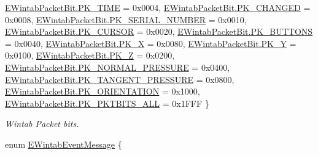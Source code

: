 \begin{DoxyCompactItemize}
\mbox{\hyperlink{namespace_wintab_d_n_a0244b62cdae8bfd39a52f0656ae7d184abf68b8b97a2e596004ec367b4ce63d26}{E\+Wintab\+Packet\+Bit.\+P\+K\+\_\+\+T\+I\+ME}} = 0x0004, 
\mbox{\hyperlink{namespace_wintab_d_n_a0244b62cdae8bfd39a52f0656ae7d184a5fa232826b657d9dfc747022b1ca86d3}{E\+Wintab\+Packet\+Bit.\+P\+K\+\_\+\+C\+H\+A\+N\+G\+ED}} = 0x0008, 
\newline
\mbox{\hyperlink{namespace_wintab_d_n_a0244b62cdae8bfd39a52f0656ae7d184ae27e538a81e4bf7f9769569b5cdd41db}{E\+Wintab\+Packet\+Bit.\+P\+K\+\_\+\+S\+E\+R\+I\+A\+L\+\_\+\+N\+U\+M\+B\+ER}} = 0x0010, 
\mbox{\hyperlink{namespace_wintab_d_n_a0244b62cdae8bfd39a52f0656ae7d184a03e28509372ceace08e89b3cbff310af}{E\+Wintab\+Packet\+Bit.\+P\+K\+\_\+\+C\+U\+R\+S\+OR}} = 0x0020, 
\mbox{\hyperlink{namespace_wintab_d_n_a0244b62cdae8bfd39a52f0656ae7d184a07c256014a5d3ca6ff2f34faa45577f4}{E\+Wintab\+Packet\+Bit.\+P\+K\+\_\+\+B\+U\+T\+T\+O\+NS}} = 0x0040, 
\mbox{\hyperlink{namespace_wintab_d_n_a0244b62cdae8bfd39a52f0656ae7d184ae7367a72ea936eb5525ff4e6b83ba02c}{E\+Wintab\+Packet\+Bit.\+P\+K\+\_\+X}} = 0x0080, 
\newline
\mbox{\hyperlink{namespace_wintab_d_n_a0244b62cdae8bfd39a52f0656ae7d184a252362a32d7e17018570eda4d184e8fd}{E\+Wintab\+Packet\+Bit.\+P\+K\+\_\+Y}} = 0x0100, 
\mbox{\hyperlink{namespace_wintab_d_n_a0244b62cdae8bfd39a52f0656ae7d184a78b0b04b0e8a16d78fd756ab58c2c0a2}{E\+Wintab\+Packet\+Bit.\+P\+K\+\_\+Z}} = 0x0200, 
\mbox{\hyperlink{namespace_wintab_d_n_a0244b62cdae8bfd39a52f0656ae7d184a92f289a82836fc13f7a0a245a88e4cad}{E\+Wintab\+Packet\+Bit.\+P\+K\+\_\+\+N\+O\+R\+M\+A\+L\+\_\+\+P\+R\+E\+S\+S\+U\+RE}} = 0x0400, 
\mbox{\hyperlink{namespace_wintab_d_n_a0244b62cdae8bfd39a52f0656ae7d184adac46407b8f4b2a4b488a0a05b24efdf}{E\+Wintab\+Packet\+Bit.\+P\+K\+\_\+\+T\+A\+N\+G\+E\+N\+T\+\_\+\+P\+R\+E\+S\+S\+U\+RE}} = 0x0800, 
\newline
\mbox{\hyperlink{namespace_wintab_d_n_a0244b62cdae8bfd39a52f0656ae7d184a0efa990069921977338d297e402e961b}{E\+Wintab\+Packet\+Bit.\+P\+K\+\_\+\+O\+R\+I\+E\+N\+T\+A\+T\+I\+ON}} = 0x1000, 
\mbox{\hyperlink{namespace_wintab_d_n_a0244b62cdae8bfd39a52f0656ae7d184a7b6c299e6217c043dbcaca3e0121bb9e}{E\+Wintab\+Packet\+Bit.\+P\+K\+\_\+\+P\+K\+T\+B\+I\+T\+S\+\_\+\+A\+LL}} = 0x1\+F\+FF
 \}
\begin{DoxyCompactList}\small\item\em Wintab Packet bits. \end{DoxyCompactList}\item 
enum \mbox{\hyperlink{namespace_wintab_d_n_a4b98724153acf19dc7b44dc911e7fd0d}{E\+Wintab\+Event\+Message}} \{ \newline

\end{DoxyCompactItemize}
